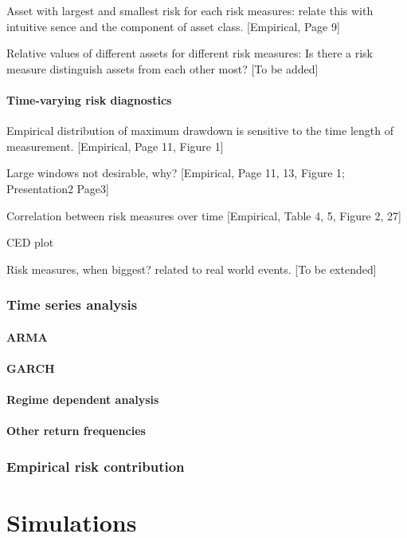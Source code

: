 \documentclass[11pt]{article}
\begin{document}
Asset with largest and smallest risk for each risk measures: relate this with intuitive sence and the component of asset class. [Empirical, Page 9]

Relative values of different assets for different risk measures: Is there a risk measure distinguish assets from each other most? [To be added]

\subsection{Time-varying risk diagnostics}


Empirical distribution of maximum drawdown is sensitive to the time length of measurement. [Empirical, Page 11, Figure 1]

Large windows not desirable, why? [Empirical, Page 11, 13, Figure 1; Presentation2 Page3]

Correlation between risk measures over time [Empirical, Table 4, 5, Figure 2, 27]

CED plot

Risk measures, when biggest? related to real world events. [To be extended]

\section{Time series analysis}

\subsection{ARMA}

\subsection{GARCH}

\subsection{Regime dependent analysis}

\subsection{Other return frequencies}

\section{Empirical risk contribution}


\part{Simulations}
\end{document}
